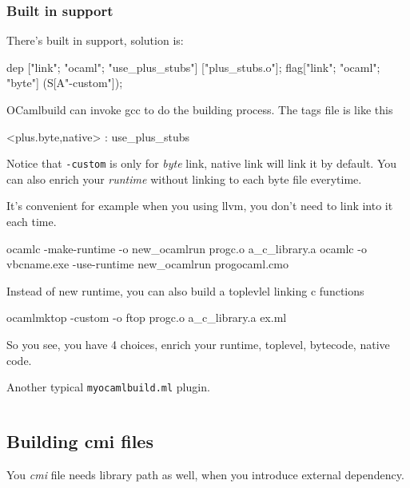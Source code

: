 \subsubsection{Built in support}
There's built in support, solution is:

\begin{ocamlcode}
    dep ["link"; "ocaml"; "use_plus_stubs"] ["plus_stubs.o"];
    flag["link"; "ocaml"; "byte"] (S[A"-custom"]);
\end{ocamlcode}

OCamlbuild can invoke gcc to do the building process. The tags file is
like this

\begin{bluetext}
<plus.{byte,native}> : use_plus_stubs  
\end{bluetext}

Notice that \verb|-custom| is only for \textit{byte} link, native link
will link it by default. You can also enrich your \textit{runtime}
without linking to each byte file everytime.

It's convenient for example when you using llvm, you don't need to
link into it each time.

\begin{bashcode}
  ocamlc -make-runtime -o new_ocamlrun progc.o a_c_library.a
  ocamlc -o vbcname.exe -use-runtime new_ocamlrun progocaml.cmo
\end{bashcode}

Instead of new runtime, you can also build a toplevlel linking c
functions

\begin{bashcode}
  ocamlmktop -custom -o ftop progc.o a_c_library.a ex.ml
\end{bashcode}

So you see, you have 4 choices, enrich your runtime, toplevel,
bytecode, native code.


Another typical \verb|myocamlbuild.ml| plugin.

\inputminted[fontsize=\scriptsize,linenos=true]{ocaml}{code/myocamlbuild/myocamlbuild.ml}


\subsection{Building cmi files}

You \textit{cmi} file needs library path as well, when you introduce
external dependency.

